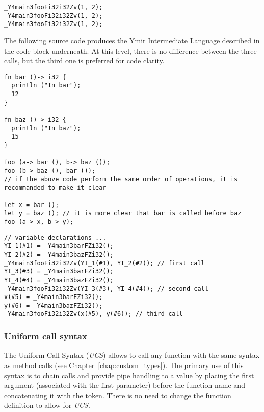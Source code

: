 \begin{lstlisting}[style=lyilVerb]
_Y4main3fooFi32i32Zv(1, 2);
_Y4main3fooFi32i32Zv(1, 2);
_Y4main3fooFi32i32Zv(1, 2);
\end{lstlisting}


The following source code produces the Ymir Intermediate Language described in
the code block underneath. At this level, there is no difference between the
three calls, but the third one is preferred for code clarity.

\begin{lstlisting}[style=coloredverbatim]
fn bar ()-> i32 {
  println ("In bar");
  12
}

fn baz ()-> i32 {
  println ("In baz");
  15
}

foo (a-> bar (), b-> baz ());
foo (b-> baz (), bar ());
// if the above code perform the same order of operations, it is recommanded to make it clear

let x = bar ();
let y = baz (); // it is more clear that bar is called before baz
foo (a-> x, b-> y);
\end{lstlisting}
\smallskip

\begin{lstlisting}[style=lyilVerb]
// variable declarations ...
YI_1(#1) = _Y4main3barFZi32();
YI_2(#2) = _Y4main3bazFZi32();
_Y4main3fooFi32i32Zv(YI_1(#1), YI_2(#2)); // first call
YI_3(#3) = _Y4main3barFZi32();
YI_4(#4) = _Y4main3bazFZi32();
_Y4main3fooFi32i32Zv(YI_3(#3), YI_4(#4)); // second call
x(#5) = _Y4main3barFZi32();
y(#6) = _Y4main3bazFZi32();
_Y4main3fooFi32i32Zv(x(#5), y(#6)); // third call
\end{lstlisting}

\subsubsection*{Uniform call syntax}

The Uniform Call Syntax (\textit{UCS}) allows to call any function with the same
syntax as method calls (see Chapter~\ref{chap:custom_types}). The primary use of
this syntax is to chain calls and provide pipe handling to a value by placing
the first argument (associated with the first parameter) before the function
name and concatenating it with the  token. There is no need to change
the function definition to allow for \textit{UCS}.

